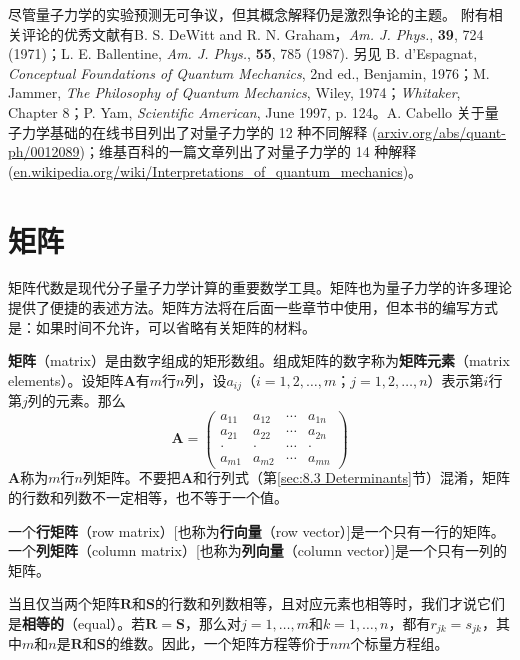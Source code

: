     尽管量子力学的实验预测无可争议，但其概念解释仍是激烈争论的主题。 附有相关评论的优秀文献有B. S. DeWitt and R. N. Graham，\textit{Am. J. Phys.}, \textbf{39}, 724 (1971)；L. E. Ballentine, \textit{Am. J. Phys.}, \textbf{55}, 785 (1987). 另见 B. d'Espagnat, \textit{Conceptual Foundations of Quantum Mechanics}, 2nd ed., Benjamin, 1976；M. Jammer, \textit{The Philosophy of Quantum Mechanics}, Wiley, 1974；\textit{Whitaker}, Chapter 8；P. Yam, \textit{Scientific American}, June 1997, p. 124。A. Cabello 关于量子力学基础的在线书目列出了对量子力学的 12 种不同解释 (\url{arxiv.org/abs/quant-ph/0012089})；维基百科的一篇文章列出了对量子力学的 14 种解释 (\url{en.wikipedia.org/wiki/Interpretations_of_quantum_mechanics})。

\section{矩阵}
\label{sec:7.10 Matrices}
    矩阵代数是现代分子量子力学计算的重要数学工具。矩阵也为量子力学的许多理论提供了便捷的表述方法。矩阵方法将在后面一些章节中使用，但本书的编写方式是：如果时间不允许，可以省略有关矩阵的材料。

    \textbf{矩阵}（matrix）是由数字组成的矩形数组。组成矩阵的数字称为\textbf{矩阵元素}（matrix elements）。设矩阵$\mathbf{A}$有$m$行$n$列，设$a_{ij}$（$i = 1,2,\ldots,m$；$j = 1,2,\ldots,n$）表示第$i$行第$j$列的元素。那么
    \begin{equation*}
        \mathbf{A} = \begin{pmatrix}
            a_{11} & a_{12} & \cdots & a_{1n} \\
            a_{21} & a_{22} & \cdots & a_{2n} \\
            \cdot & \cdot & \cdots & \cdot \\
            a_{m1} & a_{m2} & \cdots & a_{mn}
        \end{pmatrix}
    \end{equation*}
    $\mathbf{A}$称为$m$行$n$列矩阵。不要把$\mathbf{A}$和行列式（第\ref{sec:8.3 Determinants}节）混淆，矩阵的行数和列数不一定相等，也不等于一个值。

    一个\textbf{行矩阵}（row matrix）[也称为\textbf{行向量}（row vector）]是一个只有一行的矩阵。一个\textbf{列矩阵}（column matrix）[也称为\textbf{列向量}（column vector）]是一个只有一列的矩阵。

    当且仅当两个矩阵$\mathbf{R}$和$\mathbf{S}$的行数和列数相等，且对应元素也相等时，我们才说它们是\textbf{相等的}（equal）。若$\mathbf{R} = \mathbf{S}$，那么对$j = 1, \ldots, m$和$k = 1, \ldots, n$，都有$r_{jk} = s_{jk}$，其中$m$和$n$是$\mathbf{R}$和$\mathbf{S}$的维数。因此，一个矩阵方程等价于$nm$个标量方程组。

